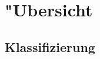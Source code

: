 %



\section{{"U}bersicht}
\label{Kapitel:Programmfehler:Uebersicht}








\subsection{Klassifizierung}
\label{Abschnitt:Programmfehler:Uebersicht:Klassifizierung}









